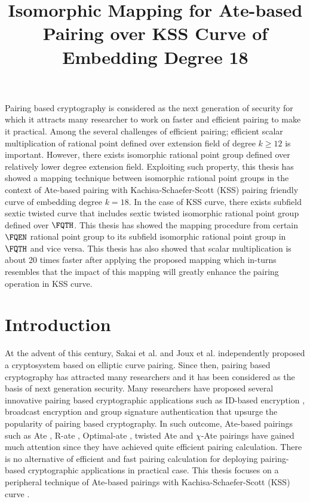 \title{Isomorphic Mapping for Ate-based Pairing over KSS Curve of Embedding Degree 18}
        Pairing based cryptography is considered as the next generation of security for which it attracts many researcher to work on faster and efficient pairing to make it practical. Among the several challenges of efficient pairing; efficient scalar multiplication of rational point defined over extension field of degree $k \geq 12$ is important. 
        However, there exists isomorphic rational point group defined over relatively lower degree extension field.
        Exploiting such property, this thesis has showed a mapping technique between isomorphic rational point groups in the context of Ate-based pairing with Kachisa-Schaefer-Scott (KSS) pairing friendly curve of embedding degree $k = 18$. In the case of KSS curve, there exists subfield sextic twisted curve that includes sextic twisted isomorphic rational point group defined over $\FQTH$. This thesis has showed the mapping procedure from  certain $\FQEN$ rational point group to its subfield isomorphic rational point group in $\FQTH$ and vice versa. This thesis has also showed that scalar multiplication is about 20 times faster after applying the proposed mapping  which in-turns resembles that the impact of this mapping will greatly enhance the pairing operation in KSS curve.
        
        \section{Introduction}
         At the advent of this century, Sakai et al. \cite{EPRINT:SakKas03} and Joux et al. \cite{JC:Joux04} independently proposed a cryptosystem based on elliptic curve pairing. Since then, pairing based cryptography has attracted many researchers and it has been considered as the basis of next generation security. Many researchers have proposed several innovative pairing based cryptographic applications such as ID-based encryption \cite{EPRINT:SakKas03}, broadcast encryption \cite{C:BonGenWat05} and group signature authentication \cite{C:BonBoySha04} that upsurge the popularity of pairing based cryptography.
        In such outcome, Ate-based pairings such as Ate \cite{DBLP:reference/crc/2005ehcc}, R-ate \cite{r_ate}, Optimal-ate \cite{DBLP:journals/tit/Vercauteren10}, twisted Ate  \cite{EPRINT:MKHO07} and $\chi$-Ate \cite{PAIRING:NASKM08} pairings have gained much attention since they have achieved quite efficient pairing calculation. 
        There is no alternative of efficient and fast pairing calculation for deploying pairing-based cryptographic applications in practical case. 
        This thesis focuses on a peripheral technique of Ate-based pairings with Kachisa-Schaefer-Scott (KSS) curve \cite{EPRINT:KacSchSco07}. 
        
